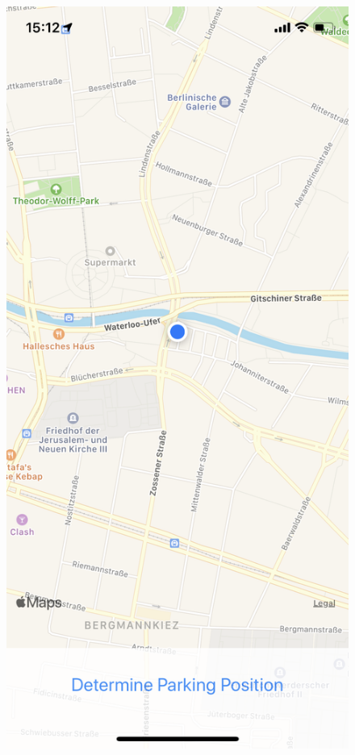\begin{figure}[h!]
\begin{minipage}{.33\textwidth}
  \centering
  \includegraphics[width=.9\linewidth]{images/App/start.png}
\end{minipage}%
\begin{minipage}{.33\textwidth}

\end{minipage}
\end{figure}
